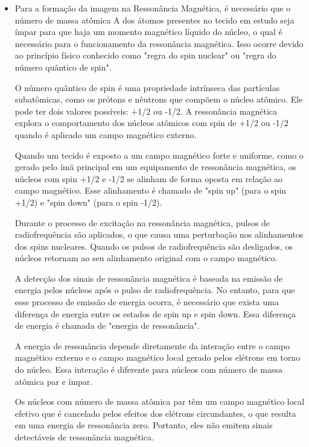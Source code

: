 \documentclass[11pt,a4paper]{article}
\newcounter{exemplo}
\begin{document}
\begin{exemplo}
\begin{itemize}
        \item Para a formação da imagem na Ressonância Magnética, é necessário que o número de massa atômica A dos átomos presentes no tecido em estudo seja ímpar para que haja um momento magnético líquido do núcleo, o qual é necessário para o funcionamento da ressonância magnética.
        Isso ocorre devido ao princípio físico conhecido como "regra do spin nuclear" ou "regra do número quântico de spin".

        O número quântico de spin é uma propriedade intrínseca das partículas subatômicas, como os prótons e nêutrons que compõem o núcleo atômico. Ele pode ter dois valores possíveis: +1/2 ou -1/2. A ressonância magnética explora o comportamento dos núcleos atômicos com spin de +1/2 ou -1/2 quando é aplicado um campo magnético externo.
        
        Quando um tecido é exposto a um campo magnético forte e uniforme, como o gerado pelo ímã principal em um equipamento de ressonância magnética, os núcleos com spin +1/2 e -1/2 se alinham de forma oposta em relação ao campo magnético. Esse alinhamento é chamado de "spin up" (para o spin +1/2) e "spin down" (para o spin -1/2).
        
        Durante o processo de excitação na ressonância magnética, pulsos de radiofrequência são aplicados, o que causa uma perturbação nos alinhamentos dos spins nucleares. Quando os pulsos de radiofrequência são desligados, os núcleos retornam ao seu alinhamento original com o campo magnético.
        
        A detecção dos sinais de ressonância magnética é baseada na emissão de energia pelos núcleos após o pulso de radiofrequência. No entanto, para que esse processo de emissão de energia ocorra, é necessário que exista uma diferença de energia entre os estados de spin up e spin down. Essa diferença de energia é chamada de "energia de ressonância".
        
        A energia de ressonância depende diretamente da interação entre o campo magnético externo e o campo magnético local gerado pelos elétrons em torno do núcleo. Essa interação é diferente para núcleos com número de massa atômica par e ímpar.
        
        Os núcleos com número de massa atômica par têm um campo magnético local efetivo que é cancelado pelos efeitos dos elétrons circundantes, o que resulta em uma energia de ressonância zero. Portanto, eles não emitem sinais detectáveis de ressonância magnética.
        

\end{itemize}
\end{exemplo}
\end{document}

